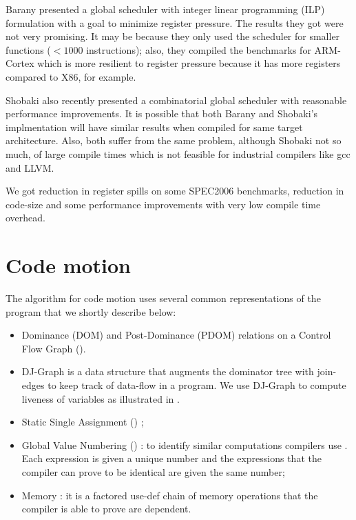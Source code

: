 \documentclass[acmlarge,review]{acmart}\settopmatter{printfolios=true}
\begin{document}
Barany \cite{barany2013} presented a global scheduler with integer linear
programming (ILP) formulation with a goal to minimize register pressure. The
results they got were not very promising. It may be because they only used the
scheduler for smaller functions ($<1000$ instructions); also, they compiled the
benchmarks for ARM-Cortex which is more resilient to register pressure because
it has more registers compared to X86, for example.

Shobaki \cite{shobaki2013} also recently presented a combinatorial global
scheduler with reasonable performance improvements. It is possible that both
Barany and Shobaki's implmentation will have similar results when compiled for
same target architecture. Also, both suffer from the same problem, although
Shobaki not so much, of large compile times which is not feasible for industrial
compilers like gcc and LLVM.

We got reduction in register spills on some SPEC2006 benchmarks, reduction in
code-size and some performance improvements with very low compile time overhead.


\section{Code motion}

The algorithm for code motion uses several common representations of the
program that we shortly describe below:
\begin{itemize}
\item Dominance (DOM) and Post-Dominance (PDOM) relations \cite{dragonbook} on a
  Control Flow Graph (\CFG{}).
\item DJ-Graph \cite{Sreedhar1996} is a data structure that augments the
  dominator tree with join-edges to keep track of data-flow in a program. We use
  DJ-Graph to compute liveness of variables as illustrated in \cite{das2012}.
\item Static Single Assignment (\SSA{}) \cite{cytron};
\item Global Value Numbering (\GVN{}) \cite{rosen1988global,click1995global}: to
  identify similar computations compilers use \GVN{}.  Each expression is given
  a unique number and the expressions that the compiler can prove to be
  identical are given the same number;
\item Memory \SSA{} \cite{novillo2007memory}: it is a factored use-def chain of
  memory operations that the compiler is able to prove are dependent.
\end{itemize}
\end{document}
